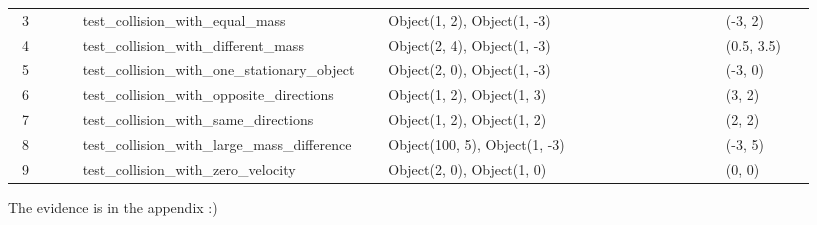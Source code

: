 \documentclass{article}
\begin{document}
\bigskip

\begin{flushleft}
\tabletail{}
\tablelasttail{}
\begin{supertabular}{m{1.186cm}m{7.5950003cm}m{5.727cm}m{3.504cm}m{0.742cm}}
\ 3 \ \ \  &
\ test\_collision\_with\_equal\_mass \ \ \ \ \ \ \ \ \ \ \  &
\ Object(1, 2), Object(1, -3) \ \ \ \ \ \ \ \ \ \ \ \ \ \ \ \ \ \ \ \ \ \  &
(-3, 2) &
~
\\
\ 4 \ \ \  &
\ test\_collision\_with\_different\_mass \ \ \ \ \ \ \  &
\ Object(2, 4), Object(1, -3) \ \ \ \ \ \ \ \ \ \ \ \ \ \ \ \ \ \ \ \ \ \  &
(0.5, 3.5) &
~
\\
\ 5 \ \ \ \  &
\ test\_collision\_with\_one\_stationary\_object  &
\ Object(2, 0), Object(1, -3) \ \ \ \ \ \ \ \ \ \ \ \ \ \ \ \ \ \ \ \ \ \  &
(-3, 0) &
~
\\
\ 6 \ \ \ \  &
\ test\_collision\_with\_opposite\_directions \ \  &
\ Object(1, 2), Object(1, 3) \ \ \ \ \ \ \ \ \ \ \ \ \ \ \ \ \ \ \ \ \ \ \  &
(3, 2) &
~
\\
\ 7 \ \ \ \  &
\ test\_collision\_with\_same\_directions \ \ \ \ \ \  &
\ Object(1, 2), Object(1, 2) \ \ \ \ \ \ \ \ \ \ \ \ \ \ \ \ \ \ \ \ \ \ \  &
(2, 2) &
~
\\
\ 8 \ \ \ \  &
\ test\_collision\_with\_large\_mass\_difference  &
\ Object(100, 5), Object(1, -3) \ \ \ \ \ \ \ \ \ \ \ \ \ \ \ \ \ \ \ \  &
(-3, 5) &
~
\\
\ 9 \ \ \ \  &
\ test\_collision\_with\_zero\_velocity \ \ \ \ \ \ \ \  &
\ Object(2, 0), Object(1, 0) \ \ \ \ \ \ \ \ \ \ \ \ \ \ \ \ \ \ \ \ \ \ \  &
(0, 0) &
~
\\
\end{supertabular}
\end{flushleft}

\bigskip


\bigskip

The evidence is in the appendix :)


\bigskip


\bigskip
\end{document}
